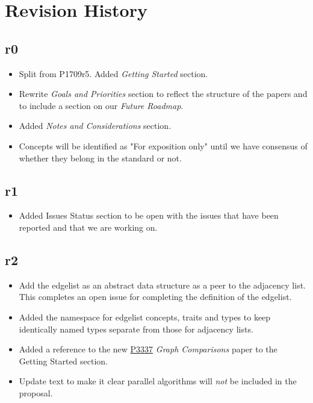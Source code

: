 \section{Revision History}

\subsection*{\paperno r0}

\begin{itemize}
      \item Split from P1709r5. Added \textit{Getting Started} section.
      \item Rewrite \textit{Goals and Priorities} section to reflect the structure of the papers and to include a section on our \textit{Future Roadmap}.
      \item Added \textit{Notes and Considerations} section.
      \item Concepts will be identified as "For exposition only" until we have consensus of whether they belong in the standard or not.
\end{itemize}

\subsection*{\paperno r1}
\begin{itemize}
      \item {Added Issues Status section to be open with the issues that have been reported and that we are working on.}
\end{itemize}

\subsection*{\paperno r2}
\begin{itemize}
      \item Add the edgelist as an abstract data structure as a peer to the adjacency list. 
            This completes an open issue for completing the definition of the edgelist.
      \item Added the  namespace for edgelist concepts, traits and types
            to keep identically named types separate from those for adjacency lists.
      \item Added a reference to the new \href{https://www.wg21.link/P3337}{P3337} \textit{Graph Comparisons} paper
            to the Getting Started section.
      \item Update text to make it clear parallel algorithms will \textit{not} be included in the proposal.
\end{itemize}
